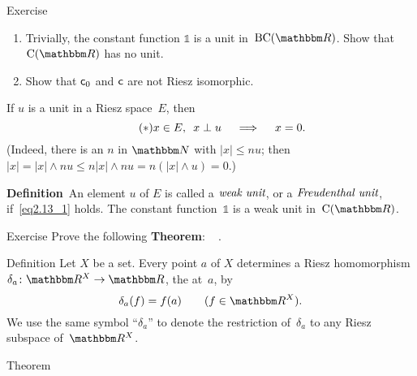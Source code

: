 \documentclass[main.tex]{subfiles}
\begin{document}
%
%
\begin{psec}{2.12}{Exercise}
\begin{enumerate}
\item \label{2.12-1}
Trivially,
the constant function $\mathbb{1}$
is a unit in~$\BCont{\R}$.
Show that~$\Cont{\R}$ has no unit.
%
\item \label{2.12-2}
Show that $\mathsf{c}_0$ and $\mathsf{c}$ are not Riesz isomorphic.
\end{enumerate}
\end{psec}
%
%
\begin{psec}{2.13}%
If $u$ is a unit in a Riesz space~$E$, 
then
\begin{equation}
\label{eq2.13_1}
\tag{$*$}
x\in E\text{, }\ x\perp u 
\quad \implies \quad
x=0
\text{.}
\end{equation}
(Indeed, there is an $n$ in $\N$ with $|x|\leq nu$;
then $|x|=|x|\wedge nu\leq n|x|\wedge nu=n(|x|\wedge u)=0$.)

\textbf{Definition}\  An element $u$ of $E$ 
is called
a $\emph{weak unit}$,
or a $\emph{Freudenthal unit}$,
if~\eqref{eq2.13_1} holds.
The constant function~$\mathbb{1}$
is a weak unit in~$\Cont{\R}$.
\end{psec}
%
%
\begin{psec}{2.14}{Exercise}
Prove the following \textbf{Theorem}: \ %
.
\end{psec}
%
%
\begin{psec}{2.15}{Definition}
Let $X$ be a set. 
Every point $a$ of $X$ determines
a Riesz homomorphism
$\delta_a\colon \R^X\ra\R$,
the  at~$a$, by
\begin{equation*}
\delta_a(f) = f(a)\qquad (f\in \R^X)
\htam{.}
\end{equation*}
We use the same symbol ``$\delta_a$''
to denote the restriction of~$\delta_a$
to any Riesz subspace of~$\R^X$.
\end{psec}
%
%
\begin{psec}{2.16}{Theorem}
\end{psec}
\end{document}
